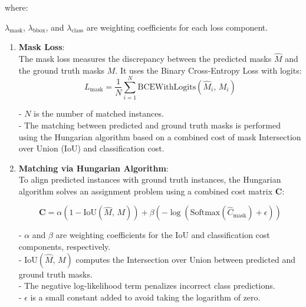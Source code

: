 where:

\( \lambda_{\text{mask}} \), \( \lambda_{\text{bbox}} \), and \( \lambda_{\text{class}} \) are weighting coefficients for each loss component.

\vspace{1.5cm}

\begin{enumerate}
    \item \textbf{Mask Loss}: \\
    The mask loss measures the discrepancy between the predicted masks \( \hat{M} \) and the ground truth masks \( M \). It uses the Binary Cross-Entropy Loss with logits:
    \begin{equation}
        L_{\text{mask}} = \frac{1}{N} \sum_{i=1}^{N} \text{BCEWithLogits}\left( \hat{M}_i, \, M_i \right) \tag{10}
    \end{equation}

    - \( N \) is the number of matched instances. \\
    - The matching between predicted and ground truth masks is performed using the Hungarian algorithm based on a combined cost of mask Intersection over Union (IoU) 
    and classification cost.
    \newpage

    \item \textbf{Matching via Hungarian Algorithm}: \\

    To align predicted instances with ground truth instances, the Hungarian algorithm solves an assignment problem using a combined cost matrix \( \mathbf{C} \):
    
    \begin{equation}
        \mathbf{C} = \alpha \left( 1 - \text{IoU}\left( \hat{M}, \, M \right) \right) + \beta \left( -\log\left( \text{Softmax}\left( \hat{C}_{\text{mask}} \right) + \epsilon \right) \right) \tag{11}
    \end{equation}
    
    - \( \alpha \) and \( \beta \) are weighting coefficients for the IoU and classification cost components, respectively. \\ 
    - \( \text{IoU}\left( \hat{M}, \, M \right) \) computes the Intersection over Union between predicted and ground truth masks. \\
    - The negative log-likelihood term penalizes incorrect class predictions. \\
    - \( \epsilon \) is a small constant added to avoid taking the logarithm of zero. \\


\end{enumerate}
